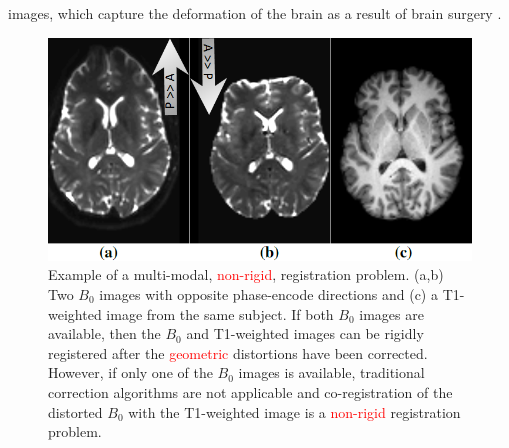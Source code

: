 images, which capture the deformation of the brain as a result of brain surgery \cite{Rivaz2015, DeNigris2012}.


\begin{figure}[t!]
\centering
    \includegraphics[width=1\linewidth]{images/T1B0Result/figure1.png}
    \closer
    \caption{{\small Example of a multi-modal, \textcolor{red}{non-rigid}, registration problem. (a,b) Two $B_{0}$ images with opposite phase-encode directions and (c) a T1-weighted image from the same subject. If both $B_{0}$ images are available, then the $B_{0}$ and T1-weighted images can be rigidly registered after the \textcolor{red}{geometric} distortions have been corrected. However, if only one of the $B_{0}$ images is available, traditional correction algorithms are not applicable and co-registration of the distorted $B_{0}$ with the T1-weighted image is a \textcolor{red}{non-rigid} registration problem.}}
\label{fig:example_t1b0_problem}\figcloser
\end{figure}
\vspace{-0.4cm}
